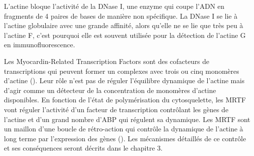 L'actine bloque l'activité de la DNase I, une enzyme qui coupe l'ADN en fragments de 4 paires de bases de manière non spécifique. La DNase I se lie à l'actine globulaire avec une grande affinité, alors qu'elle ne se lie que très peu à l'actine F, c'est pourquoi elle est souvent utilisée pour la détection de l'actine G en immunofluorescence. 

Les Myocardin-Related Transcription Factors sont des cofacteurs de transcriptions qui peuvent former un complexes avec trois ou cinq monomères d'actine (\cite{mouilleron_molecular_2008}). Leur rôle n'est pas de réguler l'équilibre dynamique de l'actine mais d'agir comme un détecteur de la concentration de monomères d'actine disponibles. 
En fonction de l'état de polymérisation du cytosquelette, les MRTF vont réguler l'activité d'un facteur de transcription contrôlant les gènes de l'actine et d'un grand nombre d'ABP qui régulent sa dynamique. 
Les MRTF sont un maillon d'une boucle de rétro-action qui contrôle la dynamique de l'actine à long terme par l'expression des gènes (\cite{salvany_core_2014}). 
Les mécanismes détaillés de ce contrôle et ses conséquences seront décrits dans le chapitre 3. 

